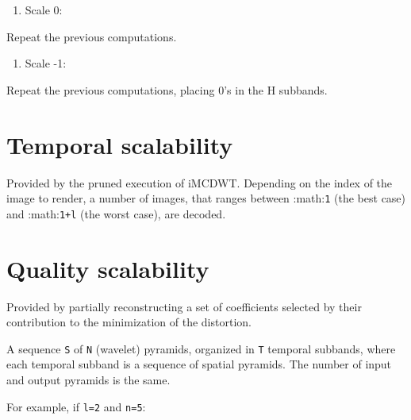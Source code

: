 {\begin{enumerate}
\def\labelenumi{\arabic{enumi}.}
\setcounter{enumi}{2}
\tightlist
\item
  Scale 0:
\end{enumerate}

Repeat the previous computations.

\begin{enumerate}
\def\labelenumi{\arabic{enumi}.}
\setcounter{enumi}{3}
\tightlist
\item
  Scale -1:
\end{enumerate}

Repeat the previous computations, placing 0's in the H subbands.

\section{Temporal scalability}
Provided by the pruned execution of iMCDWT. Depending on the index of
the image to render, a number of images, that ranges between
:math:\texttt{1} (the best case) and :math:\texttt{1+l} (the worst
case), are decoded.

\section{Quality scalability}
Provided by partially reconstructing a set of coefficients selected by
their contribution to the minimization of the distortion.

    A sequence \texttt{S} of \texttt{N} (wavelet) pyramids, organized in
\texttt{T} temporal subbands, where each temporal subband is a sequence
of spatial pyramids. The number of input and output pyramids is the
same.

For example, if \texttt{l=2} and \texttt{n=5}:

}
